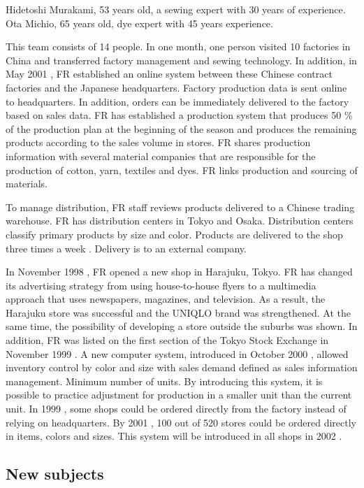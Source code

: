 \documentclass[12pt,]{article}
\begin{document}
Hidetoshi Murakami, 53 years old, a sewing expert with 30 years of
experience. Ota Michio, 65 years old, dye expert with 45 years
experience.

This team consists of 14 people. In one month, one person visited 10
factories in China and transferred factory management and sewing
technology. In addition, in May 2001 , FR established an online system
between these Chinese contract factories and the Japanese headquarters.
Factory production data is sent online to headquarters. In addition,
orders can be immediately delivered to the factory based on sales data.
FR has established a production system that produces 50 \% of the
production plan at the beginning of the season and produces the
remaining products according to the sales volume in stores. FR shares
production information with several material companies that are
responsible for the production of cotton, yarn, textiles and dyes. FR
links production and sourcing of materials.

To manage distribution, FR staff reviews products delivered to a Chinese
trading warehouse. FR has distribution centers in Tokyo and Osaka.
Distribution centers classify primary products by size and color.
Products are delivered to the shop three times a week . Delivery is to
an external company.

In November 1998 , FR opened a new shop in Harajuku, Tokyo. FR has
changed its advertising strategy from using house-to-house flyers to a
multimedia approach that uses newspapers, magazines, and television. As
a result, the Harajuku store was successful and the UNIQLO brand was
strengthened. At the same time, the possibility of developing a store
outside the suburbs was shown. In addition, FR was listed on the first
section of the Tokyo Stock Exchange in November 1999 . A new computer
system, introduced in October 2000 , allowed inventory control by color
and size with sales demand defined as sales information management.
Minimum number of units. By introducing this system, it is possible to
practice adjustment for production in a smaller unit than the current
unit. In 1999 , some shops could be ordered directly from the factory
instead of relying on headquarters. By 2001 , 100 out of 520 stores
could be ordered directly in items, colors and sizes. This system will
be introduced in all shops in 2002 .

\hypertarget{new-subjects}{%
\subsection{New subjects}\label{new-subjects}}
\end{document}
